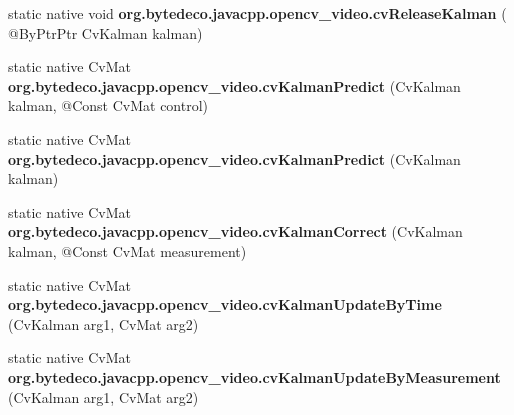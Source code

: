 \begin{DoxyCompactItemize}
$$\item 
\mbox{\label{group__video__c_gad253391df788e23f69b038b312969143}} 
static native void {\bfseries org.\+bytedeco.\+javacpp.\+opencv\+\_\+video.\+cv\+Release\+Kalman} ( @By\+Ptr\+Ptr Cv\+Kalman kalman)
\item 
\mbox{\label{group__video__c_ga6eb46d00340e96e81b017d23af3ca29e}} 
static native Cv\+Mat {\bfseries org.\+bytedeco.\+javacpp.\+opencv\+\_\+video.\+cv\+Kalman\+Predict} (Cv\+Kalman kalman, @Const Cv\+Mat control)
\item 
\mbox{\label{group__video__c_gabb148e605b9a0070099c2bd89c25eec2}} 
static native Cv\+Mat {\bfseries org.\+bytedeco.\+javacpp.\+opencv\+\_\+video.\+cv\+Kalman\+Predict} (Cv\+Kalman kalman)
\item 
\mbox{\label{group__video__c_ga346314f5c2b8a32dfb6f7b3812406fde}} 
static native Cv\+Mat {\bfseries org.\+bytedeco.\+javacpp.\+opencv\+\_\+video.\+cv\+Kalman\+Correct} (Cv\+Kalman kalman, @Const Cv\+Mat measurement)
\item 
\mbox{\label{group__video__c_ga4bff48471fd7215334abd2a408df65e9}} 
static native Cv\+Mat {\bfseries org.\+bytedeco.\+javacpp.\+opencv\+\_\+video.\+cv\+Kalman\+Update\+By\+Time} (Cv\+Kalman arg1, Cv\+Mat arg2)
\item 
\mbox{\label{group__video__c_ga3fb28bebd3dcfe5de23b408fd5e22fd6}} 
static native Cv\+Mat {\bfseries org.\+bytedeco.\+javacpp.\+opencv\+\_\+video.\+cv\+Kalman\+Update\+By\+Measurement} (Cv\+Kalman arg1, Cv\+Mat arg2)
\end{DoxyCompactItemize}

